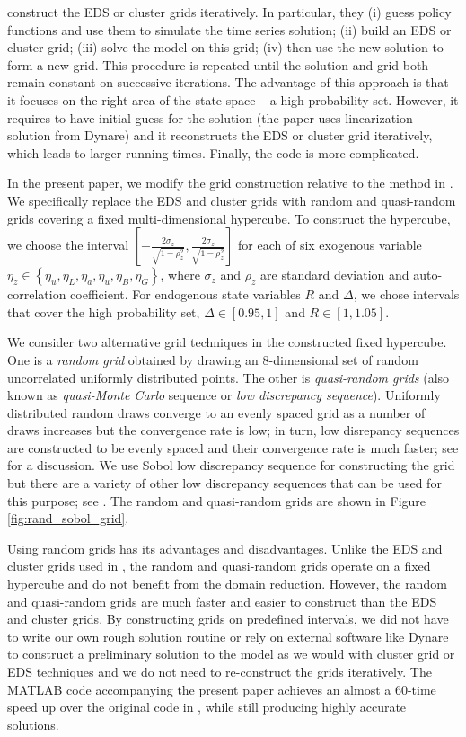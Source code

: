 \cite{MM2015} construct the EDS or cluster grids iteratively. In particular,
they (i) guess policy functions and use them to simulate the time series
solution; (ii) build an EDS or cluster grid; (iii) solve the model on this
grid; (iv) then use the new solution to form a new grid. This procedure is
repeated until the solution and grid both remain constant on successive
iterations. The advantage of this approach is that it focuses on the right area
of the state space -- a high probability set. However, it requires to have
initial guess for the solution (the paper uses linearization solution from
Dynare) and it reconstructs the EDS or cluster grid iteratively, which leads to
larger running times. Finally, the code is more complicated.

In the present paper, we modify the grid construction relative to the method in
\cite{MM2015}. We specifically replace the EDS and cluster grids with random
and quasi-random grids covering a fixed multi-dimensional hypercube. To
construct the hypercube, we choose the interval $\left[ -\frac{2\sigma
_{z}}{\sqrt{1-\rho _{z}^{2}}},\frac{2\sigma _{z}}{\sqrt{1-\rho _{z}^{2}}}
\right] $ for each of six exogenous variable $\eta _{z}\in \left \{ \eta
_{u},\eta _{L},\eta _{a},\eta _{u},\eta _{B},\eta _{G}\right \} $, where $
\sigma _{z}$ and $\rho _{z}$ are standard deviation and auto-correlation
coefficient. For endogenous state variables $R$ and $\Delta $, we chose
intervals that cover the high probability set, $\Delta \in \left[ 0.95,1
\right] $ and $R\in \left[ 1,1.05\right] $.

We consider two alternative grid techniques in the constructed fixed hypercube.
One is a \textit{random grid} obtained by drawing an 8-dimensional set of
random uncorrelated uniformly distributed points. The other is
\textit{quasi-random grids} (also known as \textit{quasi-Monte Carlo } sequence
or \textit{low discrepancy sequence}). Uniformly distributed random draws
converge to an evenly spaced grid as a number of draws increases but the
convergence rate is low; in turn, low disrepancy sequences are constructed to
be evenly spaced and their convergence rate is much faster; see \cite{MM2015}
for a discussion. We use Sobol low discrepancy sequence for constructing the
grid but there are a variety of other low discrepancy sequences that can be used
for this purpose; see \cite{niederreiter1992}. The random and quasi-random grids
are shown in Figure \ref{fig:rand_sobol_grid}.

Using random grids has its advantages and disadvantages. Unlike the EDS and
cluster grids used in \cite{MM2015}, the random and quasi-random grids operate
on a fixed hypercube and do not benefit from the domain reduction. However, the
random and quasi-random grids are much faster and easier to construct than the
EDS and cluster grids. By constructing grids on predefined intervals, we did
not have to write our own rough solution routine or rely on external software
like Dynare to construct a preliminary solution to the model as we would with
cluster grid or EDS techniques and we do not need to re-construct the grids
iteratively. The MATLAB code accompanying the present paper achieves an almost
a 60-time speed up over the original code in \cite{MM2015}, while still
producing highly accurate solutions.

